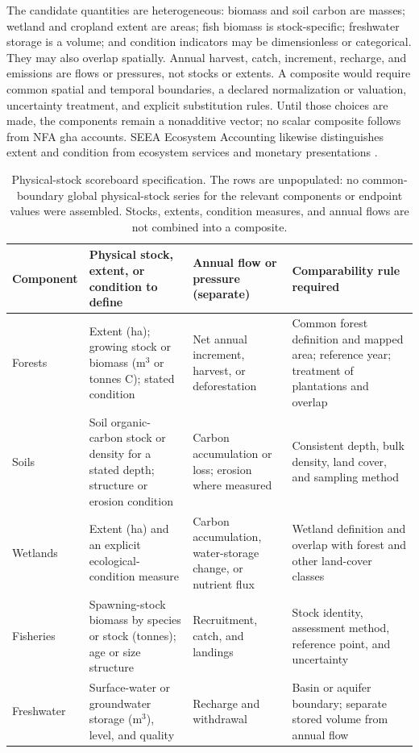 \documentclass[11pt,a4paper]{article}
\begin{document}
The candidate quantities are heterogeneous: biomass and soil carbon are masses; wetland and cropland extent are areas; fish biomass is stock-specific; freshwater storage is a volume; and condition indicators may be dimensionless or categorical. They may also overlap spatially. Annual harvest, catch, increment, recharge, and emissions are flows or pressures, not stocks or extents. A composite would require common spatial and temporal boundaries, a declared normalization or valuation, uncertainty treatment, and explicit substitution rules. Until those choices are made, the components remain a nonadditive vector; no scalar composite follows from NFA gha accounts. SEEA Ecosystem Accounting likewise distinguishes extent and condition from ecosystem services and monetary presentations \citep{UN2021SEEA_EA}.

\begin{table}[htbp]
\centering\footnotesize
\caption{Physical-stock scoreboard specification. The rows are unpopulated: no common-boundary global physical-stock series for the relevant components or endpoint values were assembled. Stocks, extents, condition measures, and annual flows are not combined into a composite.}
\label{tab:si_stock_scoreboard}
\begin{tabularx}{\textwidth}{@{}>{\raggedright\arraybackslash}p{} >{\raggedright\arraybackslash}p{} >{\raggedright\arraybackslash}p{} >{\raggedright\arraybackslash}X@{}}
\toprule
Component & Physical stock, extent, or condition to define & Annual flow or pressure (separate) & Comparability rule required \\
\midrule
Forests & Extent (ha); growing stock or biomass (m$^3$ or tonnes C); stated condition & Net annual increment, harvest, or deforestation & Common forest definition and mapped area; reference year; treatment of plantations and overlap \\
Soils & Soil organic-carbon stock or density for a stated depth; structure or erosion condition & Carbon accumulation or loss; erosion where measured & Consistent depth, bulk density, land cover, and sampling method \\
Wetlands & Extent (ha) and an explicit ecological-condition measure & Carbon accumulation, water-storage change, or nutrient flux & Wetland definition and overlap with forest and other land-cover classes \\
Fisheries & Spawning-stock biomass by species or stock (tonnes); age or size structure & Recruitment, catch, and landings & Stock identity, assessment method, reference point, and uncertainty \\
Freshwater & Surface-water or groundwater storage (m$^3$), level, and quality & Recharge and withdrawal & Basin or aquifer boundary; separate stored volume from annual flow \\
\bottomrule
\end{tabularx}
\end{table}
\end{document}
